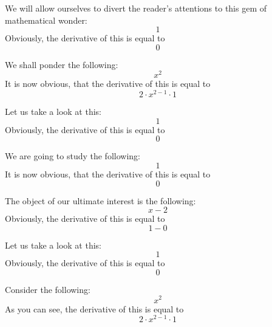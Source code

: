 \documentclass{article}
\begin{document}
We will allow ourselves to divert the reader's attentions to this gem of mathematical wonder:
\begin{equation}
1 
\end{equation}
Obviously, the derivative of this is equal to
\begin{equation}
0 
\end{equation}

We shall ponder the following:
\begin{equation}
x ^{2 } 
\end{equation}
It is now obvious, that the derivative of this is equal to
\begin{equation}
2 \cdot x ^{2 - 1 } \cdot 1 
\end{equation}

Let us take a look at this:
\begin{equation}
1 
\end{equation}
Obviously, the derivative of this is equal to
\begin{equation}
0 
\end{equation}

We are going to study the following:
\begin{equation}
1 
\end{equation}
It is now obvious, that the derivative of this is equal to
\begin{equation}
0 
\end{equation}

The object of our ultimate interest is the following:
\begin{equation}
x - 2 
\end{equation}
Obviously, the derivative of this is equal to
\begin{equation}
1 - 0 
\end{equation}

Let us take a look at this:
\begin{equation}
1 
\end{equation}
Obviously, the derivative of this is equal to
\begin{equation}
0 
\end{equation}

Consider the following:
\begin{equation}
x ^{2 } 
\end{equation}
As you can see, the derivative of this is equal to
\begin{equation}
2 \cdot x ^{2 - 1 } \cdot 1 
\end{equation}
\end{document}
